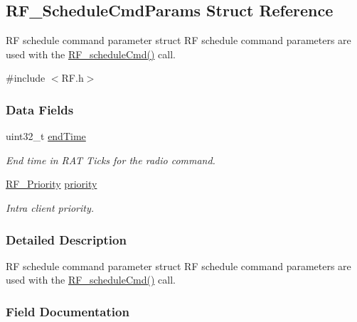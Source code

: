 \subsection{R\+F\+\_\+\+Schedule\+Cmd\+Params Struct Reference}
\label{struct_r_f___schedule_cmd_params}


R\+F schedule command parameter struct R\+F schedule command parameters are used with the \hyperlink{_r_f_8h_a5e7f25943b5f3942bf4c09cb87f9aa76}{R\+F\+\_\+schedule\+Cmd()} call.  




{\ttfamily \#include $<$R\+F.\+h$>$}

\subsubsection*{Data Fields}
\begin{DoxyCompactItemize}
\item 
uint32\+\_\+t \hyperlink{struct_r_f___schedule_cmd_params_ae4244a807352c8c93def2d39bbbd080e}{end\+Time}
\begin{DoxyCompactList}\small\item\em End time in R\+A\+T Ticks for the radio command. \end{DoxyCompactList}\item 
\hyperlink{_r_f_8h_ae5f9a893d178e64e6d0a7a783ea06e32}{R\+F\+\_\+\+Priority} \hyperlink{struct_r_f___schedule_cmd_params_a809078fc59bdf91f81ef390da0047537}{priority}
\begin{DoxyCompactList}\small\item\em Intra client priority. \end{DoxyCompactList}\end{DoxyCompactItemize}


\subsubsection{Detailed Description}
R\+F schedule command parameter struct R\+F schedule command parameters are used with the \hyperlink{_r_f_8h_a5e7f25943b5f3942bf4c09cb87f9aa76}{R\+F\+\_\+schedule\+Cmd()} call. 

\subsubsection{Field Documentation}

